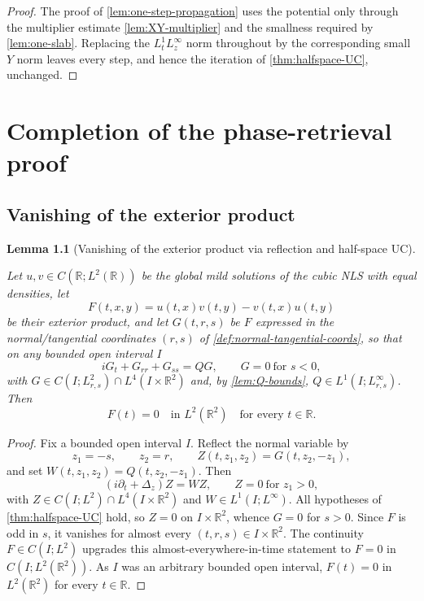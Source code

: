 \documentclass[11pt,oneside]{book}
\providecommand{\uses}[1]{}
\newtheorem{lemma}[theorem]{Lemma}
\theoremstyle{definition}
\theoremstyle{remark}
\newcommand{\R}{\mathbb R}
\newcommand{\1}{\mathbf 1}
\begin{document}
\begin{proof}
\uses{thm:halfspace-UC, lem:XY-multiplier, lem:one-slab}
The proof of \cref{lem:one-step-propagation} uses the potential only through the multiplier estimate \cref{lem:XY-multiplier} and the smallness required by \cref{lem:one-slab}. Replacing the $L^1_tL^\infty_z$ norm throughout by the corresponding small $Y$ norm leaves every step, and hence the iteration of \cref{thm:halfspace-UC}, unchanged.
\end{proof}


\chapter{Completion of the phase-retrieval proof}\label{chap:completion}

\section{Vanishing of the exterior product}

\begin{lemma}[Vanishing of the exterior product via reflection and half-space UC]
\label{lem:F-vanishing}
\uses{def:exterior-product, def:normal-tangential-coords, prop:G-equation, prop:F-equation, lem:Q-bounds}
Let $u,v\in C(\R;L^2(\R))$ be the global mild solutions of the cubic NLS with
equal densities, let
\[
 F(t,x,y)=u(t,x)v(t,y)-v(t,x)u(t,y)
\]
be their exterior product, and let $G(t,r,s)$ be $F$ expressed in the
normal/tangential coordinates $(r,s)$ of \cref{def:normal-tangential-coords},
so that on any bounded open interval $I$
\[
 iG_t+G_{rr}+G_{ss}=QG,\qquad G=0\ \text{for }s<0,
\]
with $G\in C(I;L^2_{r,s})\cap L^4(I\times\R^2)$ and, by \cref{lem:Q-bounds},
$Q\in L^1(I;L^\infty_{r,s})$.  Then
\[
 F(t)=0\quad\text{in }L^2(\R^2)\quad\text{for every }t\in\R.
\]
\end{lemma}

\begin{proof}
\uses{prop:G-equation, prop:zero-extension-jump, thm:halfspace-UC, lem:distributional-products}
Fix a bounded open interval $I$.  Reflect the normal variable by
\[
 z_1=-s,\qquad z_2=r,\qquad Z(t,z_1,z_2)=G(t,z_2,-z_1),
\]
and set $W(t,z_1,z_2)=Q(t,z_2,-z_1)$.  Then
\[
 (i\partial_t+\Delta_z)Z=WZ,\qquad Z=0\ \text{for }z_1>0 ,
\]
with $Z\in C(I;L^2)\cap L^4(I\times\R^2)$ and $W\in L^1(I;L^\infty)$.  All
hypotheses of \cref{thm:halfspace-UC} hold, so $Z=0$ on $I\times\R^2$, whence
$G=0$ for $s>0$.  Since $F$ is odd in $s$, it vanishes for almost every
$(t,r,s)\in I\times\R^2$.  The continuity $F\in C(I;L^2)$ upgrades this
almost-everywhere-in-time statement to $F=0$ in $C(I;L^2(\R^2))$.  As $I$ was
an arbitrary bounded open interval, $F(t)=0$ in $L^2(\R^2)$ for every
$t\in\R$.
\end{proof}
\end{document}
